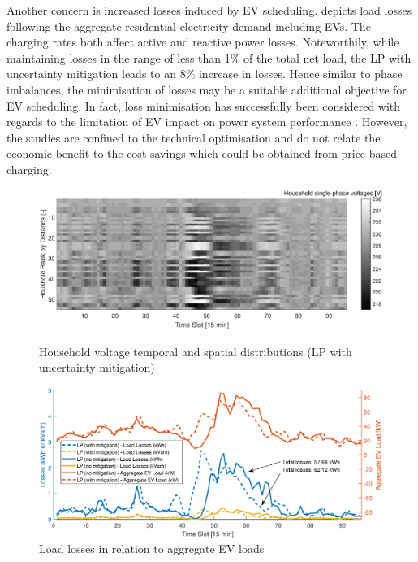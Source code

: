 Another concern is increased losses induced by EV scheduling.  depicts load losses following the aggregate residential electricity demand including EVs. The charging rates both affect active and reactive power losses. Noteworthily, while maintaining losses in the range of less than 1\% of the total net load, the LP with uncertainty mitigation leads to an 8\% increase in losses. Hence similar to phase imbalances, the minimisation of losses may be a suitable additional objective for EV scheduling. In fact, loss minimisation has successfully been considered with regards to the limitation of EV impact on power system performance \cite{Sortomme2011, Clement2010,Deilami2011, Fazelpour2014}. However, the studies are confined to the technical optimisation and do not relate the economic benefit to the cost savings which could be obtained from price-based charging.

\begin{figure}[]
	\includegraphics[width=\textwidth,trim={2cm 0cm 2cm 0cm},clip]{figures/evaluation/scen/volts.eps}
	\label{fig:volts}
	\caption{Household voltage temporal and spatial distributions (LP with uncertainty mitigation)}
\end{figure}

\begin{figure}[]
	\includegraphics[width=\textwidth,trim={2cm 0cm 2cm 0.7cm},clip]{figures/evaluation/scen/losses.eps}
	\caption{Load losses in relation to aggregate EV loads}
	\label{fig:loss}
\end{figure}

